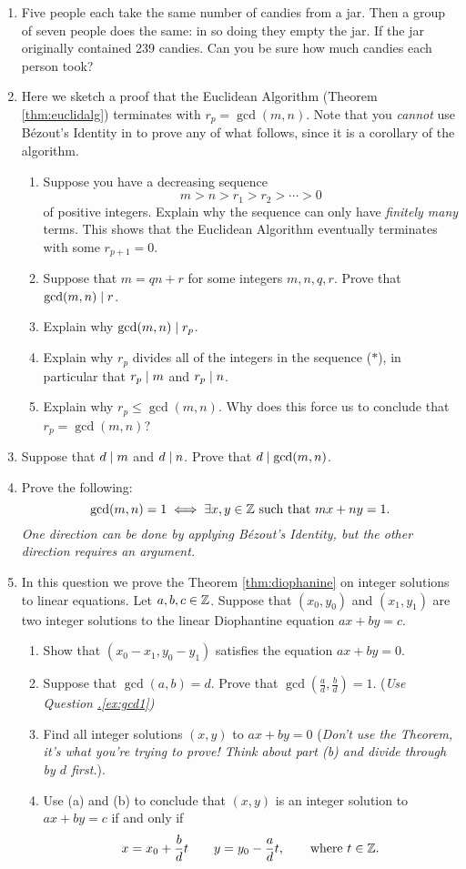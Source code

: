 \begin{exercises}{}{}
\begin{enumerate}
  \item Five people each take the same number of candies from a jar. Then a group of seven people does the same: in so doing they empty the jar. If the jar originally contained 239 candies. Can you be sure how much candies each person took?

  \item Here we sketch a proof that the Euclidean Algorithm (Theorem \ref{thm:euclidalg}) terminates with $r_p=\gcd(m,n)$. Note that you \emph{cannot} use Bézout's Identity in to prove any of what follows, since it is a corollary of the algorithm.
  \begin{enumerate}
    \item Suppose you have a decreasing sequence
    \[m>n>r_1>r_2>\cdots>0\tag*{($\ast$)}\]
    of positive integers. Explain why the sequence can only have \emph{finitely many} terms. This shows that the Euclidean Algorithm eventually terminates with some $r_{p+1}=0$.
  	\item Suppose that $m=qn+r$ for some integers $m,n,q,r$. Prove that $\gcd(m,n)\mid r$.
  	\item Explain why $\gcd(m,n)\mid r_p$.
  	\item Explain why $r_p$ divides all of the integers in the sequence ($\ast$), in particular that $r_p\mid m$ and $r_p\mid n$.
  	\item Explain why $r_p\le\gcd(m,n)$. Why does this force us to conclude that $r_p=\gcd(m,n)$?
  \end{enumerate}
  
  \item Suppose that $d\mid m$ and $d\mid n$. Prove that $d\mid\gcd(m,n)$.

  \item\label{ex:gcd1} Prove the following:
  \[\gcd(m,n)=1\iff\exists x,y\in\mathbb{Z}\text{ such that }mx+ny=1.\]
  \emph{One direction can be done by applying Bézout's Identity, but the other direction requires an argument.}
  
  
  \item In this question we prove the Theorem \ref{thm:diophanine} on integer solutions to linear equations. Let $a,b,c\in\mathbb{Z}$. Suppose that $(x_0,y_0)$ and $(x_1,y_1)$ are two integer solutions to the linear Diophantine equation $ax+by=c$.
  \begin{enumerate}
    \item Show that $(x_0-x_1,y_0-y_1)$ satisfies the equation $ax+by=0$.
    \item Suppose that $\gcd(a,b)=d$. Prove that $\gcd(\frac ad,\frac bd)=1$. (\emph{Use Question \hyperref[ex:gcd1]{\thesubsection.\ref*{ex:gcd1}})}
    \item Find all integer solutions $(x,y)$ to $ax+by=0$ (\emph{Don't use the Theorem, it's what you're trying to prove! Think about part (b) and divide through by $d$ first.}).
    \item Use (a) and (b) to conclude that $(x,y)$ is an integer solution to $ax+by=c$ if and only if
    \[x=x_0+\frac bdt\qquad y=y_0-\frac adt,\qquad \text{where }t\in\mathbb{Z}.\]
  \end{enumerate}
  

\end{enumerate}
\end{exercises}
